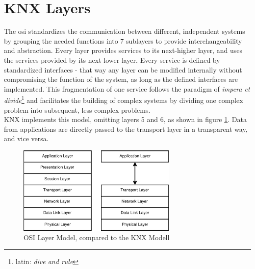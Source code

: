 \section{KNX Layers}

The \gls{osi} standardizes the communication between different, independent systems
by grouping the needed functions into 7 sublayers to provide interchangeability and abstraction. Every layer provides services to its next-higher layer, and
uses the services provided by its next-lower layer. Every service is defined by standardized interfaces - that way any layer can be modified internally without
compromising the function of the system, as long as the defined interfaces are implemented. This fragmentation of one service follows the paradigm of 
\textit{impera et divide}\footnote{latin: \textit{dive and rule}} and facilitates the building of complex systems by dividing one complex problem into subsequent,
less-complex problems.
\\
KNX implements this model, omitting 
layers 5 and 6, as shown in figure \ref{fig:knxlayers}. Data from applications are directly passed to the transport layer in a transparent way, and vice versa.
\begin{figure}
    \centering
    \includegraphics[width=0.7\textwidth]{figures/KNXvsISO.eps}
    \caption{OSI Layer Model, compared to the KNX Modell}
    \label{fig:knxlayers}
\end{figure}

